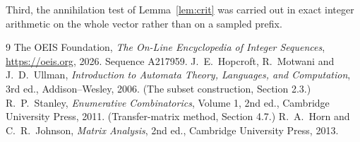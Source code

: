 \documentclass[11pt,a4paper]{article}
\theoremstyle{plain}
\theoremstyle{definition}
\begin{document}
Third, the annihilation test of Lemma~\ref{lem:crit} was carried out in exact integer
arithmetic on the whole vector rather than on a sampled prefix.

\begin{thebibliography}{9}
 The OEIS Foundation, \emph{The On-Line Encyclopedia of Integer
Sequences}, \url{https://oeis.org}, 2026. Sequence A217959.
 J.~E.~Hopcroft, R.~Motwani and J.~D.~Ullman, \emph{Introduction to Automata
Theory, Languages, and Computation}, 3rd ed., Addison--Wesley, 2006. (The subset
construction, Section 2.3.)
 R.~P.~Stanley, \emph{Enumerative Combinatorics}, Volume 1, 2nd ed.,
Cambridge University Press, 2011. (Transfer-matrix method, Section 4.7.)
 R.~A.~Horn and C.~R.~Johnson, \emph{Matrix Analysis}, 2nd ed., Cambridge
University Press, 2013.
\end{thebibliography}
\end{document}
